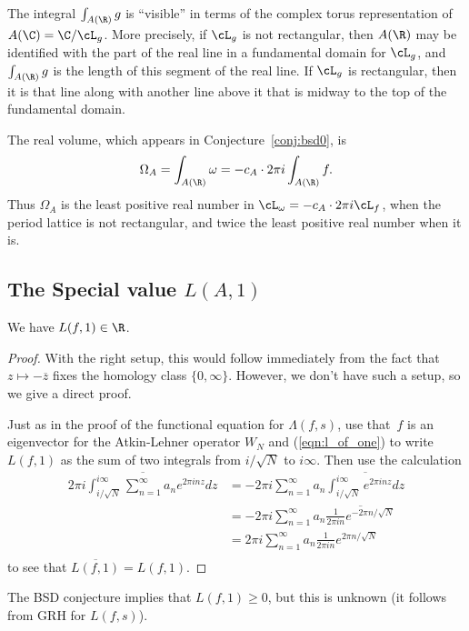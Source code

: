 \documentclass{report}
\begin{document}
The integral $\int_{A(\R)} g$ is ``visible'' in terms of the complex
torus representation of $A(\C)=\C/\cL_g$.  More precisely, if $\cL_g$
is not rectangular, then $A(\R)$ may be identified with the part of
the real line in a fundamental domain for $\cL_g$, and $\int_{A(\R)}
g$ is the length of this segment of the real line.  If $\cL_g$ is
rectangular, then it is that line along with another line above it
that is midway to the top of the fundamental domain.

The real volume, which appears in
Conjecture~\ref{conj:bsd0}, is
$$
\Omega_A = \int_{A(\R)} \omega = -c_A \cdot 2\pi i \int_{A(\R)} f.
$$
Thus $\Omega_A$ is the least positive real number in
$\cL_\omega=-c_A \cdot 2\pi i\cL_f$, when the period lattice is not
rectangular, and twice the least positive real number when it is.

\subsection{The Special value $L(A,1)$}
\begin{proposition}\label{prop:realL}
We have $L(f,1)\in\R$.
\end{proposition}

\begin{proof}
With the right setup, this would follow immediately from the
fact that  $z\mapsto -\overline{z}$ fixes the
homology class $\{0,\infty\}$.   However, we don't have such
a setup, so we give a direct proof.

  Just as in the proof of the functional equation for $\Lambda(f,s)$,
  use that~$f$ is an eigenvector for the Atkin-Lehner operator $W_N$
  and (\ref{eqn:l_of_one}) to write $L(f,1)$ as the sum of two
  integrals from $i/\sqrt{N}$ to $i\infty$.  Then use the
  calculation
\begin{align*}
 \overline{ 2\pi i \int_{i/\sqrt{N}}^{i\infty} \sum_{n=1}^{\infty} a_n e^{2\pi i n z} dz }
 & = -2\pi i \sum_{n=1}^{\infty} a_n \overline{\int_{i/\sqrt{N}}^{i\infty} e^{2\pi i n z} dz} \\
   &=
 -2\pi i \sum_{n=1}^{\infty} a_n \overline{\frac{1}{2\pi i n} e^{-2\pi n/\sqrt{N}}} \\
&= 2\pi i \sum_{n=1}^{\infty} a_n \frac{1}{2\pi i n} e^{2\pi n/\sqrt{N}} \\
\end{align*}
to see that $\overline{L(f,1)} = L(f,1)$.
\end{proof}

\begin{remark}
The BSD conjecture implies that $L(f,1)\geq 0$, but this is unknown
(it follows from GRH for $L(f,s)$).
\end{remark}
\end{document}
